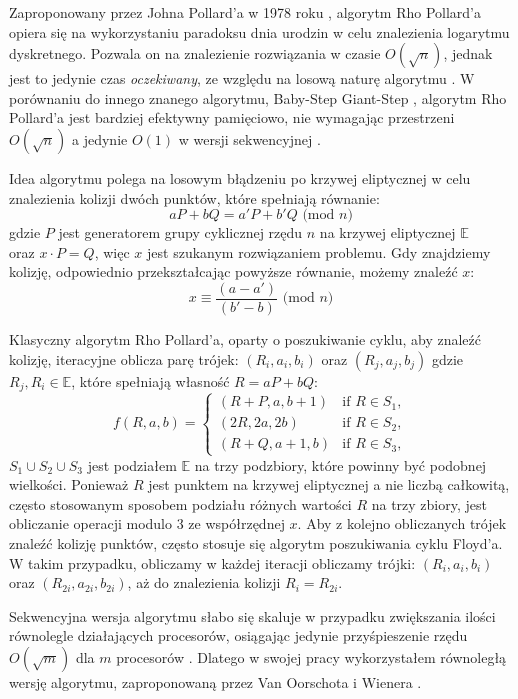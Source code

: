 Zaproponowany przez Johna Pollard'a w 1978 roku \cite{Pollard1978},
algorytm Rho Pollard'a opiera się na wykorzystaniu paradoksu dnia urodzin w celu znalezienia logarytmu dyskretnego.
Pozwala on na znalezienie rozwiązania w czasie $O(\sqrt{n})$,
jednak jest to jedynie czas \textit{oczekiwany}, ze względu na losową naturę algorytmu \cite{Blake2005}.
W porównaniu do innego znanego algorytmu, Baby-Step Giant-Step \cite{Stinson2021}, algorytm Rho Pollard'a jest bardziej
efektywny pamięciowo, nie wymagając
przestrzeni $O(\sqrt{n})$ a jedynie $O(1)$ w wersji sekwencyjnej \cite{Stinson2021}\cite{Blake2005}.
\par

Idea algorytmu polega na losowym błądzeniu po krzywej eliptycznej
w celu znalezienia kolizji dwóch punktów, które spełniają równanie:
$$
    a P + b Q = a' P + b' Q \textrm{ (mod } n)
$$
gdzie $P$ jest generatorem grupy cyklicznej rzędu $n$ na krzywej eliptycznej $\mathbb{E}$ \\
oraz $x \cdot P = Q$, więc $x$ jest szukanym rozwiązaniem problemu.
Gdy znajdziemy kolizję, odpowiednio przekształcając powyższe równanie, możemy znaleźć
$x$:
$$
    x \equiv \frac{(a-a')}{(b'-b)} \textrm{ (mod } n)
$$


Klasyczny algorytm Rho Pollard'a, oparty o poszukiwanie cyklu,
aby znaleźć kolizję, iteracyjne oblicza parę trójek:
$(R_i,a_i,b_i)$ oraz $(R_j,a_j,b_j)$ gdzie $R_j, R_i \in \mathbb{E}$, które spełniają
własność $R = a P + b Q$:
$$
    f(R,a,b) =
    \begin{cases}
        (R + P,a,b+1)     & \text{if } R \in S_1, \\
        (2R,2a, 2b)       & \text{if } R \in S_2, \\
        (R + Q, a + 1, b) & \text{if } R \in S_3,
    \end{cases}
$$
$S_1 \cup S_2 \cup S_3$ jest podziałem $\mathbb{E}$ na trzy podzbiory, które powinny być podobnej wielkości.
Ponieważ $R$ jest punktem na krzywej eliptycznej a nie liczbą całkowitą, często stosowanym sposobem
podziału różnych wartości $R$ na trzy zbiory, jest obliczanie operacji modulo $3$ ze współrzędnej $x$.
Aby z kolejno obliczanych trójek znaleźć kolizję punktów, często stosuje się algorytm poszukiwania cyklu Floyd'a.
W takim przypadku, obliczamy w każdej iteracji obliczamy trójki: $(R_i, a_i, b_i)$ oraz $(R_{2i}, a_{2i}, b_{2i})$, aż do znalezienia
kolizji $R_i = R_{2i}$.

\par
Sekwencyjna wersja algorytmu słabo się skaluje w przypadku zwiększania ilości równolegle działających procesorów,
osiągając jedynie przyśpieszenie rzędu $O(\sqrt{m})$ dla $m$ procesorów \cite{Oorschot}.
Dlatego w swojej pracy wykorzystałem równoległą wersję algorytmu, zaproponowaną przez Van Oorschota i Wienera \cite{Oorschot}.

